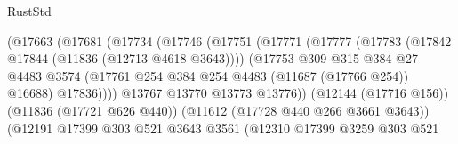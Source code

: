 \begin{lexlean}{RustStd}
\begin{coremodule}
                                        (@17663
                                          (@17681
                                            (@17734
                                              (@17746
                                                (@17751
                                                  (@17771
                                                    (@17777
                                                      (@17783
                                                        (@17842
                                                          @17844
                                                          (@11836 (@12713 @4618 @3643))))
                                                      (@17753
                                                        @309
                                                        @315
                                                        @384
                                                        @27
                                                        @4483
                                                        @3574
                                                        (@17761
                                                          @254
                                                          @384
                                                          @254
                                                          @4483
                                                          (@11687 (@17766 @254))
                                                          @16688)
                                                        @17836))))
                                                @13767
                                                @13770
                                                @13773
                                                @13776))
                                            (@12144 (@17716 @156))
                                            (@11836 (@17721 @626 @440))
                                            (@11612 (@17728 @440 @266 @3661 @3643))
                                            (@12191
                                              @17399
                                              @303
                                              @521
                                              @3643
                                              @3561
                                              (@12310
                                                @17399
                                                @3259
                                                @303
                                                @521

\end{coremodule}
\end{lexlean}
